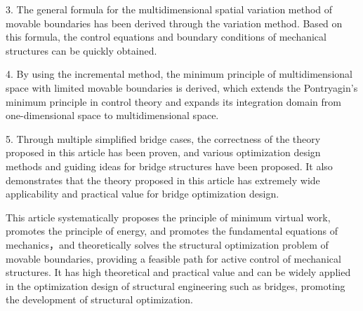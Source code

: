 3. The general formula for the multidimensional spatial variation method of movable boundaries has been derived through the variation method. Based on this formula, the control equations and boundary conditions of mechanical structures can be quickly obtained.

4. By using the incremental method, the minimum principle of multidimensional space with limited movable boundaries is derived, which extends the Pontryagin's minimum principle in control theory and expands its integration domain from one-dimensional space to multidimensional space.

5. Through multiple simplified bridge cases, the correctness of the theory proposed in this article has been proven, and various optimization design methods and guiding ideas for bridge structures have been proposed. It also demonstrates that the theory proposed in this article has extremely wide applicability and practical value for bridge optimization design.

This article systematically proposes the principle of minimum virtual work, promotes the principle of energy, and promotes the fundamental equations of mechanics，and theoretically solves the structural optimization problem of movable boundaries, providing a feasible path for active control of mechanical structures. It has high theoretical and practical value and can be widely applied in the optimization design of structural engineering such as bridges, promoting the development of structural optimization.